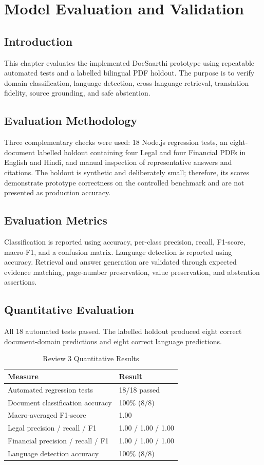 \chapter{Model Evaluation and Validation}
\label{chap:model_evaluation}

\section{Introduction}
This chapter evaluates the implemented DocSaarthi prototype using repeatable automated tests and a labelled bilingual PDF holdout. The purpose is to verify domain classification, language detection, cross-language retrieval, translation fidelity, source grounding, and safe abstention.

\section{Evaluation Methodology}
Three complementary checks were used: 18 Node.js regression tests, an eight-document labelled holdout containing four Legal and four Financial PDFs in English and Hindi, and manual inspection of representative answers and citations. The holdout is synthetic and deliberately small; therefore, its scores demonstrate prototype correctness on the controlled benchmark and are not presented as production accuracy.

\section{Evaluation Metrics}
Classification is reported using accuracy, per-class precision, recall, F1-score, macro-F1, and a confusion matrix. Language detection is reported using accuracy. Retrieval and answer generation are validated through expected evidence matching, page-number preservation, value preservation, and abstention assertions.

\section{Quantitative Evaluation}
All 18 automated tests passed. The labelled holdout produced eight correct document-domain predictions and eight correct language predictions.

\begin{table}[H]
\centering
\caption{Review 3 Quantitative Results}
\begin{tabular}{|p{7cm}|p{5cm}|}
\hline
\textbf{Measure} & \textbf{Result} \\
\hline
Automated regression tests & 18/18 passed \\
\hline
Document classification accuracy & 100\% (8/8) \\
\hline
Macro-averaged F1-score & 1.00 \\
\hline
Legal precision / recall / F1 & 1.00 / 1.00 / 1.00 \\
\hline
Financial precision / recall / F1 & 1.00 / 1.00 / 1.00 \\
\hline
Language detection accuracy & 100\% (8/8) \\
\hline
\end{tabular}
\end{table}

